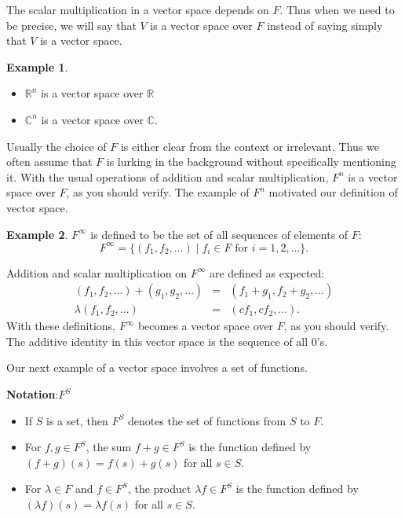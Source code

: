 \documentclass[
]{book}
\providecommand{\tightlist}{%
  \setlength{\itemsep}{0pt}\setlength{\parskip}{0pt}}
\theoremstyle{definition}
\theoremstyle{definition}
\newtheorem{example}{Example}[chapter]
\theoremstyle{definition}
\theoremstyle{definition}
\theoremstyle{remark}
\begin{document}
The scalar multiplication in a vector space depends on \(F\).
Thus when we need to be precise, we will say that \(V\) is a vector space over \(F\) instead of saying simply that \(V\) is a vector space.

\begin{example}
\protect\hypertarget{exm:unnamed-chunk-24}{}\label{exm:unnamed-chunk-24}\leavevmode

\begin{itemize}
\tightlist
\item
  \(\mathbb{R}^n\) is a vector space over \(\mathbb{R}\)
\item
  \(\mathbb{C}^n\) is a vector space over \(\mathbb{C}\).
\end{itemize}

\end{example}

Usually the choice of \(F\) is either clear from the context or irrelevant. Thus we often assume that \(F\) is lurking in the background without specifically mentioning it. With the usual operations of addition and scalar multiplication, \(F^n\) is a vector space over \(F\), as you should verify. The example of \(F^n\) motivated our definition of vector space.

\begin{example}
\protect\hypertarget{exm:unnamed-chunk-25}{}\label{exm:unnamed-chunk-25}\(F^\infty\) is defined to be the set of all sequences of elements of \(F\):
\[F^\infty = \{(f_1, f_2, \ldots) \mid f_i \in F \text{ for } i = 1, 2, \ldots\}.\]

Addition and scalar multiplication on \(F^\infty\) are defined as expected:
\begin{eqnarray*}
(f_1, f_2, \ldots) + (g_1, g_2, \ldots) &=& (f_1 + g_1, f_2 + g_2, \ldots)\\
\lambda(f_1, f_2, \ldots) &=& (cf_1, cf_2, \ldots).
\end{eqnarray*}
With these definitions, \(F^\infty\) becomes a vector space over \(F\), as you should verify.
The additive identity in this vector space is the sequence of all 0's.
\end{example}

Our next example of a vector space involves a set of functions.

\textbf{Notation}:\(F^S\)

\begin{itemize}
\tightlist
\item
  If \(S\) is a set, then \(F^S\) denotes the set of functions from \(S\) to \(F\).
\item
  For \(f,g \in F^S\), the sum \(f + g \in F^S\) is the function defined by \((f + g)(s) = f(s) + g(s)\) for all \(s \in S\).
\item
  For \(\lambda \in F\) and \(f \in F^S\), the product \(\lambda f \in F^S\) is the function defined by \((\lambda f)(s) = \lambda f(s)\) for all \(s \in S\).
\end{itemize}
\end{document}
